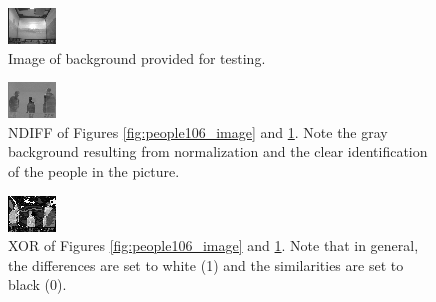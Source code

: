 \documentclass[a4paper, 10pt, titlepage]{article}
\begin{document}
\begin{figure}[!htb]
    \centering
    \includegraphics[width=0.45\linewidth]{background.png}
    \caption{Image of background provided for testing.}
    \label{fig:background_image}
\end{figure}

\begin{figure}[!htb]
    \centering
    \includegraphics[width=0.45\linewidth]{processor_test_ndiff.png}
    \caption{NDIFF of Figures \ref{fig:people106_image} and \ref{fig:background_image}. Note the gray background resulting from normalization and the clear identification of the people in the picture.}
    \label{fig:ndiff_image}
\end{figure}

\begin{figure}[!htb]
    \centering
    \includegraphics[width=0.45\linewidth]{processor_test_xor.png}
    \caption{XOR of Figures \ref{fig:people106_image} and \ref{fig:background_image}. Note that in general, the differences are set to white (1) and the similarities are set to black (0).}
    \label{fig:xor_image}
\end{figure}
\end{document}
